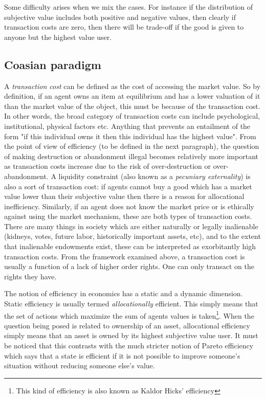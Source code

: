 Some difficulty arises when we mix the cases. For instance if the distribution of subjective value includes both positive and negative values, then clearly if transaction costs are zero, then there will be trade-off if the good is given to anyone but the highest value user.

\subsection{Coasian paradigm}\label{coase}

A \textit{transaction cost} can be defined as the cost of accessing the market value. So by definition, if an agent owns an item at equilibrium and has a lower valuation of it than the market value of the object, this must be because of the transaction cost. In other words, the broad category of transaction costs can include psychological, institutional, physical factors etc. Anything that prevents an entailment of the form "if this individual owns it then this individual has the highest value". From the point of view of efficiency (to be defined in the next paragraph), the question of making destruction or abandonment illegal becomes relatively more important as transaction costs increase due to the risk of over-destruction or over-abandonment. A liquidity constraint (also known as a \textit{pecuniary externality}) is also a sort of transaction cost: if agents cannot buy a good which has a market value lower than their subjective value then there is a reason for allocational inefficiency. Similarly, if an agent does not know the market price or is ethically against using the market mechanism, these are both types of transaction costs. There are many things in society which are either naturally or legally inalienable (kidneys, votes, future labor, historically important assets, etc), and to the extent that inalienable endowments exist, these can be interpreted as exorbitantly high transaction costs. From the framework examined above, a transaction cost is usually a function of a lack of higher order rights. One can only transact on the rights they have.

The notion of efficiency in economics has a static and a dynamic dimension. Static efficiency is usually termed \textit{allocationally} efficient. This simply means that the set of actions which maximize the sum of agents values is taken\footnote{This kind of efficiency is also known as Kaldor Hicks' efficiency}. When the question being posed is related to ownership of an asset, allocational efficiency simply means that an asset is owned by its highest subjective value user. It must be noticed that this contrasts with the much stricter notion of Pareto efficiency which says that a state is efficient if it is not possible to improve someone's situation without reducing someone else's value. 


